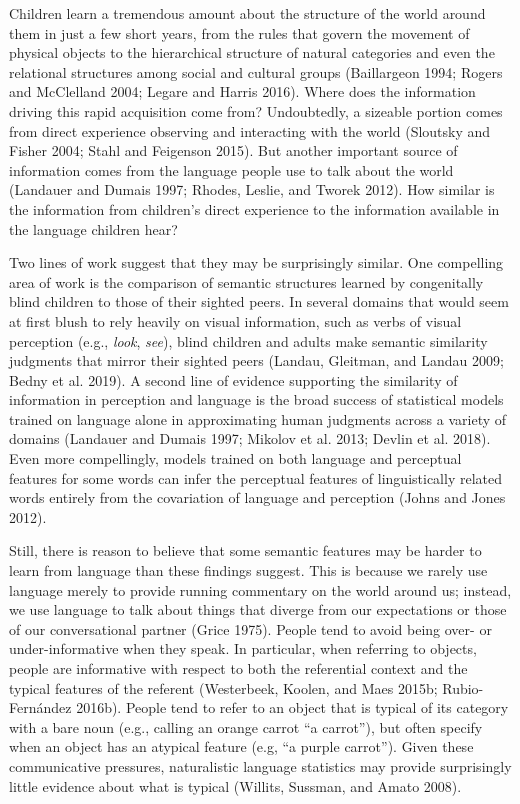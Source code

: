 \documentclass{ucetd}
\begin{document}
Children learn a tremendous amount about the structure of the world
around them in just a few short years, from the rules that govern the
movement of physical objects to the hierarchical structure of natural
categories and even the relational structures among social and cultural
groups (Baillargeon 1994; Rogers and McClelland 2004; Legare and Harris
2016). Where does the information driving this rapid acquisition come
from? Undoubtedly, a sizeable portion comes from direct experience
observing and interacting with the world (Sloutsky and Fisher 2004;
Stahl and Feigenson 2015). But another important source of information
comes from the language people use to talk about the world (Landauer and
Dumais 1997; Rhodes, Leslie, and Tworek 2012). How similar is the
information from children's direct experience to the information
available in the language children hear?

Two lines of work suggest that they may be surprisingly similar. One
compelling area of work is the comparison of semantic structures learned
by congenitally blind children to those of their sighted peers. In
several domains that would seem at first blush to rely heavily on visual
information, such as verbs of visual perception (e.g., \emph{look},
\emph{see}), blind children and adults make semantic similarity
judgments that mirror their sighted peers (Landau, Gleitman, and Landau
2009; Bedny et al. 2019). A second line of evidence supporting the
similarity of information in perception and language is the broad
success of statistical models trained on language alone in approximating
human judgments across a variety of domains (Landauer and Dumais 1997;
Mikolov et al. 2013; Devlin et al. 2018). Even more compellingly, models
trained on both language and perceptual features for some words can
infer the perceptual features of linguistically related words entirely
from the covariation of language and perception (Johns and Jones 2012).

Still, there is reason to believe that some semantic features may be
harder to learn from language than these findings suggest. This is
because we rarely use language merely to provide running commentary on
the world around us; instead, we use language to talk about things that
diverge from our expectations or those of our conversational partner
(Grice 1975). People tend to avoid being over- or under-informative when
they speak. In particular, when referring to objects, people are
informative with respect to both the referential context and the typical
features of the referent (Westerbeek, Koolen, and Maes 2015b;
Rubio-Fernández 2016b). People tend to refer to an object that is
typical of its category with a bare noun (e.g., calling an orange carrot
``a carrot''), but often specify when an object has an atypical feature
(e.g, ``a purple carrot''). Given these communicative pressures,
naturalistic language statistics may provide surprisingly little
evidence about what is typical (Willits, Sussman, and Amato 2008).
\end{document}
